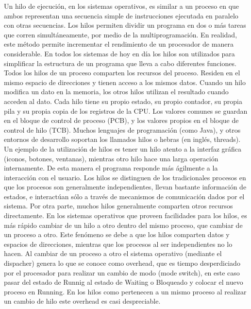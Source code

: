 \documentclass[conference]{IEEEtran}
\begin{document}
Un hilo de ejecución, en los sistemas operativos, es similar a un proceso en que ambos representan una secuencia simple de instrucciones ejecutada en paralelo con otras secuencias. Los hilos permiten dividir un programa en dos o más tareas que corren simultáneamente, por medio de la multiprogramación. En realidad, este método permite incrementar el rendimiento de un procesador de manera considerable. En todos los  sistemas de hoy en día los hilos son utilizados para simplificar la estructura de un programa que lleva a cabo diferentes funciones.
Todos los hilos de un proceso comparten los recursos del proceso. Residen en el mismo espacio de direcciones y tienen acceso a los mismos datos. Cuando un hilo modifica un dato en la memoria, los otros hilos utilizan el resultado cuando acceden al dato. Cada hilo tiene su propio estado, su propio contador, su propia pila y su propia  copia de los registros de la CPU. Los valores comunes se guardan en el bloque de control de proceso (PCB), y los valores propios en el bloque de control de hilo (TCB).
Muchos lenguajes de programación (como Java), y otros entornos de desarrollo soportan los llamados hilos o hebras (en inglés, threads).
Un ejemplo de la utilización de hilos es tener un hilo atento a la interfaz gráfica (iconos, botones, ventanas), mientras otro hilo hace una larga operación internamente.
De esta manera el programa responde más ágilmente a la interacción con el usuario.
Los hilos se distinguen de los tradicionales procesos en que los procesos son generalmente independientes, llevan bastante información de estados, e interactúan sólo a través de mecanismos de comunicación dados por el sistema. Por otra parte, muchos hilos generalmente comparten otros recursos directamente. En los sistemas operativos que proveen facilidades para los hilos, es más rápido cambiar de un hilo a otro dentro del mismo proceso, que cambiar de un proceso a otro. Este fenómeno se debe a que los hilos comparten datos y espacios de direcciones, mientras que los procesos al ser independientes no lo hacen. Al cambiar de un proceso a otro el sistema operativo (mediante el dispacher) genera lo que se conoce como overhead, que es tiempo desperdiciado por el procesador para realizar un cambio de modo (mode switch), en este caso pasar del estado de Runnig al estado de Waiting o Bloqueado y colocar el nuevo proceso en Running. En los hilos como pertenecen a un mismo proceso al realizar un cambio de hilo este overhead es casi despreciable.
\end{document}

